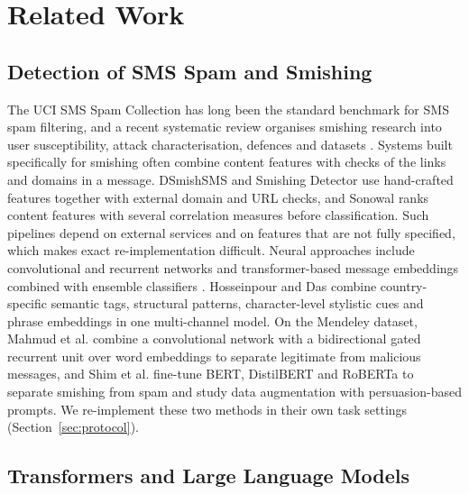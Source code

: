 \section{Related Work}\label{sec:related}

\subsection{Detection of SMS Spam and Smishing}\label{sec:rel-detect}

The UCI SMS Spam Collection \cite{almeida2011} has long been the standard benchmark for SMS spam filtering, and a recent systematic review organises smishing research into user susceptibility, attack characterisation, defences and datasets \cite{pritom2026}. Systems built specifically for smishing often combine content features with checks of the links and domains in a message. DSmishSMS \cite{mishra2023dsmishsms} and Smishing Detector \cite{mishra2022detector} use hand-crafted features together with external domain and URL checks, and Sonowal \cite{sonowal2020} ranks content features with several correlation measures before classification. Such pipelines depend on external services and on features that are not fully specified, which makes exact re-implementation difficult. Neural approaches include convolutional and recurrent networks \cite{roy2020} and transformer-based message embeddings combined with ensemble classifiers \cite{ghourabi2023}. Hosseinpour and Das \cite{hosseinpour2025} combine country-specific semantic tags, structural patterns, character-level stylistic cues and phrase embeddings in one multi-channel model. On the Mendeley dataset, Mahmud et al. \cite{mahmud2024} combine a convolutional network with a bidirectional gated recurrent unit over word embeddings to separate legitimate from malicious messages, and Shim et al. \cite{shim2024} fine-tune BERT, DistilBERT and RoBERTa to separate smishing from spam and study data augmentation with persuasion-based prompts. We re-implement these two methods in their own task settings (Section~\ref{sec:protocol}).

\subsection{Transformers and Large Language Models}\label{sec:rel-llm}

